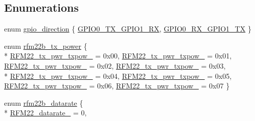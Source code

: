 \subsection*{Enumerations}
\begin{DoxyCompactItemize}
\item 
enum \hyperlink{group___p_i_o_s___r_f_m22_b_gaccc7d029df9e5a96151a68e64f4be7e2}{gpio\-\_\-direction} \{ \hyperlink{group___p_i_o_s___r_f_m22_b_ggaccc7d029df9e5a96151a68e64f4be7e2a87c92cb693852456c28e74d75b67b00a}{G\-P\-I\-O0\-\_\-\-T\-X\-\_\-\-G\-P\-I\-O1\-\_\-\-R\-X}, 
\hyperlink{group___p_i_o_s___r_f_m22_b_ggaccc7d029df9e5a96151a68e64f4be7e2a914b463221cba0d76f04cd178ef2d8f0}{G\-P\-I\-O0\-\_\-\-R\-X\-\_\-\-G\-P\-I\-O1\-\_\-\-T\-X}
 \}
\item 
enum \hyperlink{group___p_i_o_s___r_f_m22_b_gaad7a4f0b388c5c9323bb4ced4e9356cc}{rfm22b\-\_\-tx\-\_\-power} \{ \\*
\hyperlink{group___p_i_o_s___r_f_m22_b_ggaad7a4f0b388c5c9323bb4ced4e9356cca3b8061dc56ef54a7f5db4bf1e74c5319}{R\-F\-M22\-\_\-tx\-\_\-pwr\-\_\-txpow\-\_} = 0x00, 
\hyperlink{group___p_i_o_s___r_f_m22_b_ggaad7a4f0b388c5c9323bb4ced4e9356cca6d5a44ebcaa13080170d647910a721c1}{R\-F\-M22\-\_\-tx\-\_\-pwr\-\_\-txpow\-\_} = 0x01, 
\hyperlink{group___p_i_o_s___r_f_m22_b_ggaad7a4f0b388c5c9323bb4ced4e9356cca211047452ea729f5c4836e2732c750e4}{R\-F\-M22\-\_\-tx\-\_\-pwr\-\_\-txpow\-\_} = 0x02, 
\hyperlink{group___p_i_o_s___r_f_m22_b_ggaad7a4f0b388c5c9323bb4ced4e9356cca47ab0e394ffb21472cc73bd3ea4ba139}{R\-F\-M22\-\_\-tx\-\_\-pwr\-\_\-txpow\-\_} = 0x03, 
\\*
\hyperlink{group___p_i_o_s___r_f_m22_b_ggaad7a4f0b388c5c9323bb4ced4e9356ccae3308a1793a8636dd4127b88516a8ae5}{R\-F\-M22\-\_\-tx\-\_\-pwr\-\_\-txpow\-\_} = 0x04, 
\hyperlink{group___p_i_o_s___r_f_m22_b_ggaad7a4f0b388c5c9323bb4ced4e9356cca725b92623670d326be838a450a1970fc}{R\-F\-M22\-\_\-tx\-\_\-pwr\-\_\-txpow\-\_} = 0x05, 
\hyperlink{group___p_i_o_s___r_f_m22_b_ggaad7a4f0b388c5c9323bb4ced4e9356cca31374e8ebc5c7afb036fba8c6d69336c}{R\-F\-M22\-\_\-tx\-\_\-pwr\-\_\-txpow\-\_} = 0x06, 
\hyperlink{group___p_i_o_s___r_f_m22_b_ggaad7a4f0b388c5c9323bb4ced4e9356ccade87df0ea8ae8e430c1fc59bad39ecc7}{R\-F\-M22\-\_\-tx\-\_\-pwr\-\_\-txpow\-\_} = 0x07
 \}
\item 
enum \hyperlink{group___p_i_o_s___r_f_m22_b_gaa3e170044f27a00c422ee75f98130ef1}{rfm22b\-\_\-datarate} \{ \\*
\hyperlink{group___p_i_o_s___r_f_m22_b_ggaa3e170044f27a00c422ee75f98130ef1a36bc9a3bd8b78d019dbd7d2495169ce4}{R\-F\-M22\-\_\-datarate\-\_} = 0, 

\end{DoxyCompactItemize}
